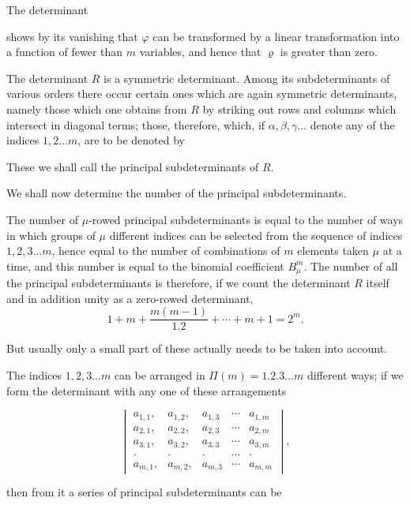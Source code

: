 
The determinant


shows by its vanishing that $\varphi$ can be transformed by a linear transformation into a function of fewer than $m$ variables, and hence that $\varrho$ is greater than zero.

The determinant $R$ is a symmetric determinant. Among its subdeterminants of various orders there occur certain ones which are again symmetric determinants, namely those which one obtains from $R$ by striking out rows and columns which intersect in diagonal terms; those, therefore, which, if $\alpha, \beta, \gamma \ldots$ denote any of the indices $1, 2 \ldots m$, are to be denoted by


These we shall call the principal subdeterminants of $R$.

We shall now determine the number of the principal subdeterminants.

The number of $\mu$-rowed principal subdeterminants is equal to the number of ways in which groups of $\mu$ different indices can be selected from the sequence of indices $1, 2, 3 \ldots m$, hence equal to the number of combinations of $m$ elements taken $\mu$ at a time, and this number is equal to the binomial coefficient $B_\mu^m$. The number of all the principal subdeterminants is therefore, if we count the determinant $R$ itself and in addition unity as a zero-rowed determinant,
\[
1 + m + \frac{m(m-1)}{1.2} + \cdots + m + 1 = 2^m.
\]

But usually only a small part of these actually needs to be taken into account.

The indices $1, 2, 3 \ldots m$ can be arranged in $\Pi(m) = 1.2.3 \ldots m$ different ways; if we form the determinant with any one of these arrangements

\[
\begin{vmatrix}
a_{1,1}, & a_{1,2}, & a_{1,3} & \cdots & a_{1,m} \\
a_{2,1}, & a_{2,2}, & a_{2,3} & \cdots & a_{2,m} \\
a_{3,1}, & a_{3,2}, & a_{3,3} & \cdots & a_{3,m} \\
\cdot & \cdot & \cdot & \cdots & \cdot \\
a_{m,1}, & a_{m,2}, & a_{m,3} & \cdots & a_{m,m}
\end{vmatrix},
\]

then from it a series of principal subdeterminants can be
